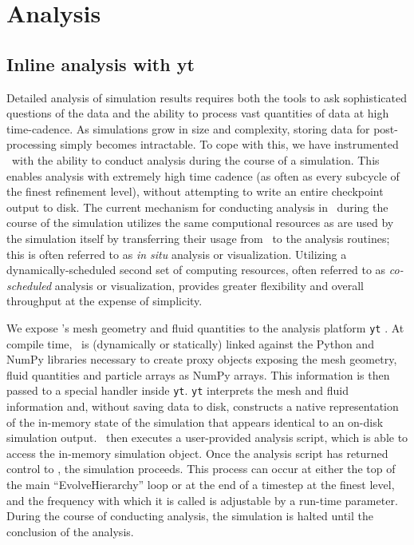 \section{Analysis}
\label{sec.num.analysis}

\subsection{Inline analysis with yt}

Detailed analysis of simulation results requires both the tools to ask
sophisticated questions of the data and the ability to process vast
quantities of data at high time-cadence.  As simulations grow in size
and complexity, storing data for post-processing simply becomes
intractable.  To cope with this, we have instrumented \enzo\ with the
ability to conduct analysis during the course of a simulation.  This
enables analysis with extremely high time cadence (as often as every
subcycle of the finest refinement level), without attempting to write
an entire checkpoint output to disk.  The current mechanism for
conducting analysis in \enzo\ during the course of the simulation
utilizes the same computional resources as are used by the simulation
itself by transferring their usage from \enzo\ to the analysis
routines; this is often referred to as \textit{in situ} analysis or
visualization.  Utilizing a dynamically-scheduled second set of
computing resources, often referred to as \textit{co-scheduled}
analysis or visualization, provides greater flexibility and overall
throughput at the expense of simplicity.

We expose \enzo's mesh geometry and fluid quantities to the analysis
platform \texttt{yt} \citep{2011ApJS..192....9T, 2011arXiv1112.4482T}.
At compile time, \enzo\ is (dynamically or statically) linked against
the Python and NumPy libraries necessary to create proxy objects
exposing the mesh geometry, fluid quantities and particle arrays as
NumPy arrays.  This information is then passed to a special handler
inside \texttt{yt}.  \texttt{yt} interprets the mesh and fluid
information and, without saving data to disk, constructs a native
representation of the in-memory state of the simulation that appears
identical to an on-disk simulation output.  \enzo\ then executes a
user-provided analysis script, which is able to access the in-memory
simulation object.  Once the analysis script has returned control to
\enzo, the simulation proceeds.  This process can occur at either the
top of the main ``EvolveHierarchy'' loop or at the end of a timestep
at the finest level, and the frequency with which it is called is
adjustable by a run-time parameter.  During the course of conducting
analysis, the simulation is halted until the conclusion of the
analysis.

